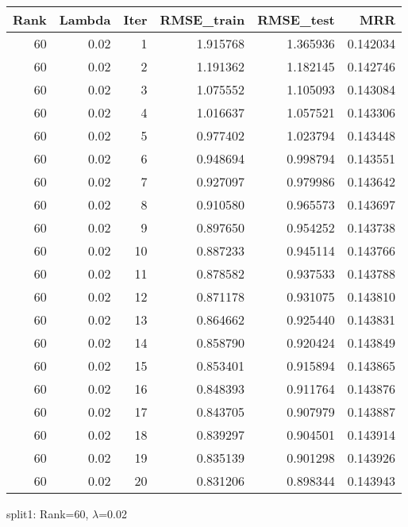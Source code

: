 \begin{tabular}{rrrrrr}
\toprule
 Rank &  Lambda &  Iter &  RMSE\_train &  RMSE\_test &       MRR \\
\midrule
   60 &    0.02 &     1 &    1.915768 &   1.365936 &  0.142034 \\
   60 &    0.02 &     2 &    1.191362 &   1.182145 &  0.142746 \\
   60 &    0.02 &     3 &    1.075552 &   1.105093 &  0.143084 \\
   60 &    0.02 &     4 &    1.016637 &   1.057521 &  0.143306 \\
   60 &    0.02 &     5 &    0.977402 &   1.023794 &  0.143448 \\
   60 &    0.02 &     6 &    0.948694 &   0.998794 &  0.143551 \\
   60 &    0.02 &     7 &    0.927097 &   0.979986 &  0.143642 \\
   60 &    0.02 &     8 &    0.910580 &   0.965573 &  0.143697 \\
   60 &    0.02 &     9 &    0.897650 &   0.954252 &  0.143738 \\
   60 &    0.02 &    10 &    0.887233 &   0.945114 &  0.143766 \\
   60 &    0.02 &    11 &    0.878582 &   0.937533 &  0.143788 \\
   60 &    0.02 &    12 &    0.871178 &   0.931075 &  0.143810 \\
   60 &    0.02 &    13 &    0.864662 &   0.925440 &  0.143831 \\
   60 &    0.02 &    14 &    0.858790 &   0.920424 &  0.143849 \\
   60 &    0.02 &    15 &    0.853401 &   0.915894 &  0.143865 \\
   60 &    0.02 &    16 &    0.848393 &   0.911764 &  0.143876 \\
   60 &    0.02 &    17 &    0.843705 &   0.907979 &  0.143887 \\
   60 &    0.02 &    18 &    0.839297 &   0.904501 &  0.143914 \\
   60 &    0.02 &    19 &    0.835139 &   0.901298 &  0.143926 \\
   60 &    0.02 &    20 &    0.831206 &   0.898344 &  0.143943 \\
\bottomrule
\end{tabular}

\caption{split1: Rank=60, $\lambda$=0.02}
